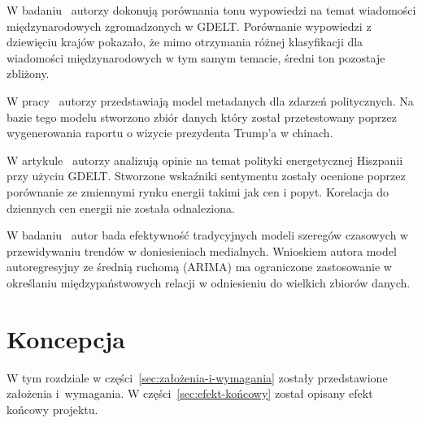 \documentclass[11pt]{report}
\begin{document}
    W badaniu~\cite{Ma2017} autorzy dokonują porównania tonu wypowiedzi na temat wiadomości międzynarodowych zgromadzonych w GDELT.
    Porównanie wypowiedzi z dziewięciu krajów pokazało, że mimo otrzymania różnej klasyfikacji dla wiadomości międzynarodowych w tym samym temacie, średni ton pozostaje zbliżony.

    W pracy~\cite{Wang2018} autorzy przedstawiają model metadanych dla zdarzeń politycznych.
    Na bazie tego modelu stworzono zbiór danych który został przetestowany poprzez wygenerowania raportu o wizycie prezydenta Trump'a w chinach.

    W artykule~\cite{Bodas-Sagi2016} autorzy analizują opinie na temat polityki energetycznej Hiszpanii przy użyciu GDELT.
    Stworzone wskaźniki sentymentu zostały ocenione poprzez porównanie ze zmiennymi rynku energii takimi jak cen i popyt.
    Korelacja do dziennych cen energii nie została odnaleziona.

    W badaniu~\cite{Yuan2017a} autor bada efektywność tradycyjnych modeli szeregów czasowych w przewidywaniu trendów w doniesieniach medialnych.
    Wnioskiem autora model autoregresyjny ze średnią ruchomą (ARIMA) ma ograniczone zastosowanie w określaniu międzypaństwowych relacji w odniesieniu do wielkich zbiorów danych.


    \chapter{Koncepcja}\label{ch:koncepcja}

    W tym rozdziale w części~\ref{sec:założenia-i-wymagania} zostały przedstawione założenia i~wymagania.
    W części~\ref{sec:efekt-końcowy} został opisany efekt końcowy projektu.
\end{document}
